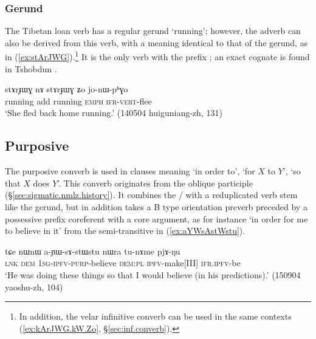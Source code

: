 \subsubsection{ Gerund} \label{sec:stArJWG}
The Tibetan loan verb  has a regular gerund  `running'; however, the adverb  can also be derived from this verb, with a meaning identical to that of the gerund, as in (\ref{ex:stArJWG}).\footnote{In addition, the velar infinitive converb  can be used in the same contexts (\ref{ex:kArJWG.kW.Zo}, §\ref{sec:inf.converb}). } It is the only verb with the prefix ; an exact cognate  is found in Tshobdun \citep[610]{jackson19tshobdun}.

\begin{exe}
\ex \label{ex:stArJWG}
\gll stɤrɟɯɣ nɤ stɤrɟɯɣ ʑo jo-nɯ-pʰɣo \\
running add running \textsc{emph} \textsc{ifr}-\textsc{vert}-flee \\
\glt `She fled back home running.' (140504 huiguniang-zh, 131)
\end{exe}

 
\subsection{Purposive} \label{sec:purposive.converb}
The purposive converb is used in clauses meaning `in order to',  `for $X$ to $Y$', `so that $X$ does $Y$'. This converb originates from the oblique participle (§\ref{sec:sigmatic.nmlz.history}). It combines the / with a reduplicated verb stem like the gerund, but in addition takes a B type orientation preverb preceded by a possessive prefix coreferent with a core argument, as for instance  `in order for me to believe in it' from the semi-transitive  in (\ref{ex:aYWsAstWstu}). 

\begin{exe}
\ex \label{ex:aYWsAstWstu}
\gll  tɕe nɯnɯ a-ɲɯ-sɤ-stɯ\redp{}stu nɯra tu-nɤme pjɤ-ŋu \\
\textsc{lnk} \textsc{dem} \textsc{1sg}-\textsc{ipfv}-\textsc{purp}-believe \textsc{dem}:\textsc{pl} \textsc{ipfv}-make[III] \textsc{ifr}.\textsc{ipfv}-be \\
\glt `He was doing these things so that I would believe (in his predictions).' (150904 yaoshu-zh, 104)
\end{exe}

